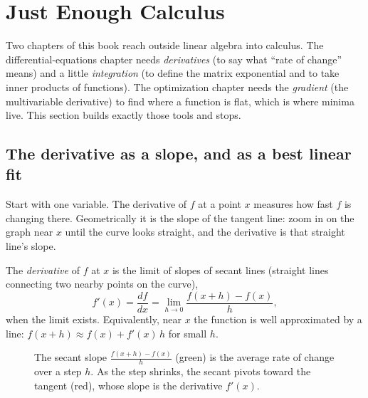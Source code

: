 \section{Just Enough Calculus}
\label{ch39:calculus}

Two chapters of this book reach outside linear algebra into calculus. The differential-equations
chapter needs \emph{derivatives} (to say what ``rate of change'' means) and a little
\emph{integration} (to define the matrix exponential and to take inner products of functions). The
optimization chapter needs the \emph{gradient} (the multivariable derivative) to find where a
function is flat, which is where minima live. This section builds exactly those tools and stops.

\subsection{The derivative as a slope, and as a best linear fit}
\label{ch39:derivative}

Start with one variable. The derivative of $f$ at a point $x$ measures how fast $f$ is changing
there. Geometrically it is the slope of the tangent line: zoom in on the graph near $x$ until the
curve looks straight, and the derivative is that straight line's slope.

\begin{formalbox}
The \emph{derivative} of $f$ at $x$ is the limit of slopes of secant lines (straight lines connecting
two nearby points on the curve),
\[
f'(x) = \frac{df}{dx} = \lim_{h\to 0}\frac{f(x+h) - f(x)}{h},
\]
when the limit exists. Equivalently, near $x$ the function is well approximated by a line:
$f(x+h) \approx f(x) + f'(x)\,h$ for small $h$.
\end{formalbox}

\begin{figure}[H]
\centering
{}
\caption{The secant slope $\frac{f(x+h)-f(x)}{h}$ (green) is the average rate of change over a step
$h$. As the step shrinks, the secant pivots toward the tangent (red), whose slope is the derivative
$f'(x)$.}
\label{ch39:fig-derivative}
\end{figure}

